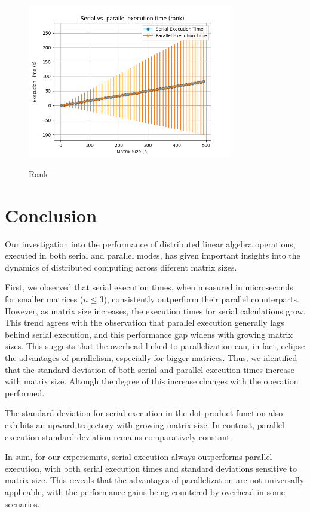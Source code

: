 \begin{figure}[H]
    \includegraphics[width=0.8\textwidth, keepaspectratio]{img/rank_2_500_5.png}
    \centering
    \label{fig:rank}
    \caption{Rank}
\end{figure}  

\section{Conclusion}
Our investigation into the performance of distributed linear algebra operations, executed in both serial and parallel modes, has given important insights into the dynamics of distributed computing across diferent matrix sizes.

First, we observed that serial execution times, when measured in microseconds for smaller matrices ($n \le 3$), consistently outperform their parallel counterparts. However, as matrix size increases, the execution times for serial calculations grow. This trend agrees with the observation that parallel execution generally lags behind serial execution, and this performance gap widens with growing matrix sizes. This suggests that the overhead linked to parallelization can, in fact, eclipse the advantages of parallelism, especially for bigger matrices. Thus, we identified that the standard deviation of both serial and parallel execution times increase with matrix size. Altough the degree of this increase changes with the operation performed.

The standard deviation for serial execution in the dot product function also exhibits an upward trajectory with growing matrix size. In contrast, parallel execution standard deviation remains comparatively constant.

In sum, for our experiemnts, serial execution always outperforms parallel execution, with both serial execution times and standard deviations sensitive to matrix size. This reveals that the advantages of parallelization are not universally applicable, with the performance gains being countered by overhead in some scenarios.

